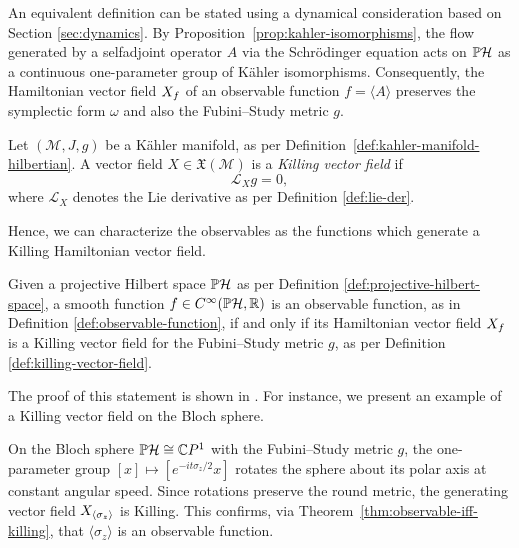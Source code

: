 An equivalent definition can be stated using a dynamical consideration based on Section \ref{sec:dynamics}. By Proposition~\ref{prop:kahler-isomorphisms}, the flow generated by a selfadjoint operator $A$ via the Schrödinger equation acts on $\PH$ as a continuous one-parameter group of Kähler isomorphisms. Consequently, the Hamiltonian vector field $X_{f}$ of an observable function $f = \langle A \rangle$ preserves the symplectic form $\omega$ and also the Fubini--Study metric $g$.

\begin{definition}
	\label{def:killing-vector-field}
	Let $(\mathcal{M},J,g)$ be a Kähler manifold, as per Definition~\ref{def:kahler-manifold-hilbertian}. A vector field $X \in \mathfrak{X}(\mathcal{M})$ is a \emph{Killing vector field} if
	\begin{equation}
		\mathcal{L}_X g = 0,
	\end{equation}
	where $\mathcal{L}_X$ denotes the Lie derivative as per Definition \ref{def:lie-der}.
\end{definition}

\noindent Hence, we can characterize the observables as the functions which generate a Killing Hamiltonian vector field.

\begin{theorem}
	\label{thm:observable-iff-killing}
	Given a projective Hilbert space $\PH$ as per Definition \ref{def:projective-hilbert-space}, a smooth function $f\in C^\infty(\PH,\R)$ is an observable function, as in Definition \ref{def:observable-function}, if and only if its Hamiltonian vector field $X_{f}$ is a Killing vector field for the Fubini--Study metric $g$, as per Definition \ref{def:killing-vector-field}.
\end{theorem}

\noindent The proof of this statement is shown in \cite[p.13]{ashtekarGeometricalFormulationQuantum1997}. For instance, we present an example of a Killing vector field on the Bloch sphere.

\begin{example}
	On the Bloch sphere $\PH\cong\C P^1$ with the Fubini--Study metric $g$,
	the one-parameter group $[x]\mapsto[e^{-it\sigma_z/2}x]$ rotates the
	sphere about its polar axis at constant angular speed. Since rotations
	preserve the round metric, the generating vector field
	$X_{\langle\sigma_z\rangle}$ is Killing. This confirms,
	via Theorem~\ref{thm:observable-iff-killing}, that $\langle\sigma_z\rangle$
	is an observable function.
\end{example}


